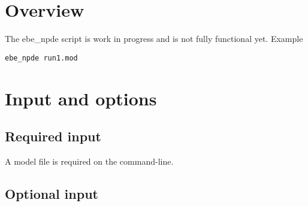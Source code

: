 


\maketitle


\section{Overview}

The ebe\_npde script is work in progress and is not fully functional yet.
Example
\begin{verbatim}
ebe_npde run1.mod
\end{verbatim}

\section{Input and options}

\subsection{Required input}

A model file is required on the command-line.

\subsection{Optional input}

